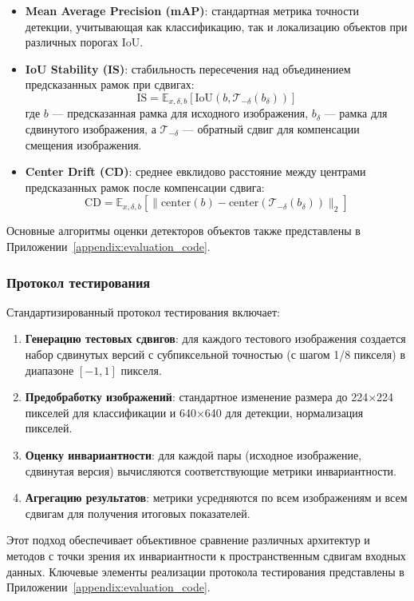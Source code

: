 \begin{itemize}
    \item \textbf{Mean Average Precision (mAP)}: стандартная метрика точности детекции, учитывающая как классификацию, так и локализацию объектов при различных порогах IoU.
    
    \item \textbf{IoU Stability (IS)}: стабильность пересечения над объединением предсказанных рамок при сдвигах:
    \begin{equation}
    \text{IS} = \mathbb{E}_{x, \delta, b} \left[ \text{IoU} \left( b, \mathcal{T}_{-\delta}(b_{\delta}) \right) \right]
    \end{equation}
    где $b$ — предсказанная рамка для исходного изображения, $b_{\delta}$ — рамка для сдвинутого изображения, а $\mathcal{T}_{-\delta}$ — обратный сдвиг для компенсации смещения изображения.
    
    \item \textbf{Center Drift (CD)}: среднее евклидово расстояние между центрами предсказанных рамок после компенсации сдвига:
    \begin{equation}
    \text{CD} = \mathbb{E}_{x, \delta, b} \left[ \| \text{center}(b) - \text{center}(\mathcal{T}_{-\delta}(b_{\delta})) \|_2 \right]
    \end{equation}
\end{itemize}

Основные алгоритмы оценки детекторов объектов также представлены в Приложении~\ref{appendix:evaluation_code}.

\subsubsection{Протокол тестирования}
\label{sec:evaluation:protocol}

Стандартизированный протокол тестирования включает:

\begin{enumerate}
    \item \textbf{Генерацию тестовых сдвигов}: для каждого тестового изображения создается набор сдвинутых версий с субпиксельной точностью (с шагом 1/8 пикселя) в диапазоне $[-1, 1]$ пикселя.
    
    \item \textbf{Предобработку изображений}: стандартное изменение размера до 224×224 пикселей для классификации и 640×640 для детекции, нормализация пикселей.
    
    \item \textbf{Оценку инвариантности}: для каждой пары (исходное изображение, сдвинутая версия) вычисляются соответствующие метрики инвариантности.
    
    \item \textbf{Агрегацию результатов}: метрики усредняются по всем изображениям и всем сдвигам для получения итоговых показателей.
\end{enumerate}

Этот подход обеспечивает объективное сравнение различных архитектур и методов с точки зрения их инвариантности к пространственным сдвигам входных данных. Ключевые элементы реализации протокола тестирования представлены в Приложении~\ref{appendix:evaluation_code}.

\newpage
